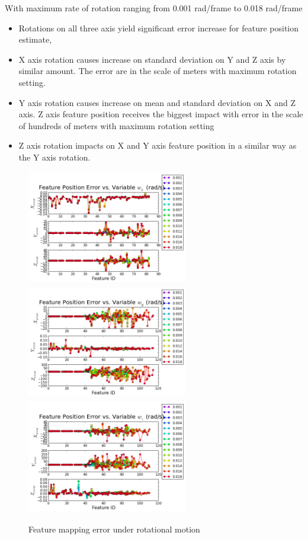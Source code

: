 With maximum rate of rotation ranging from 0.001 rad/frame to 0.018
rad/frame

\begin{itemize}
  \item Rotations on all three axis yield significant error increase
  for feature position estimate,
  \item X axis rotation causes increase on standard deviation on Y and
  Z axis by similar amount. The error are in the scale of meters with
  maximum rotation setting.
  \item Y axis rotation causes increase on mean and standard deviation
  on X and Z axis. Z axis feature position receives the biggest impact
  with error in the scale of hundreds of meters with maximum rotation
  setting
  \item Z axis rotation impacts on X and Y axis feature position in a
  similar way as the Y axis rotation.
\end{itemize}

\begin{figure}[h]%
  \centering
  \includegraphics[width=7cm, height=5cm]{./Figures/SimulationFigures/Figure17.png}
  \includegraphics[width=7cm, height=5cm]{./Figures/SimulationFigures/Figure18.png}
  \includegraphics[width=7cm, height=5cm]{./Figures/SimulationFigures/Figure19.png}
  \caption{Feature mapping error under rotational motion}
  \label{fig:simfig17-19}
\end{figure}

